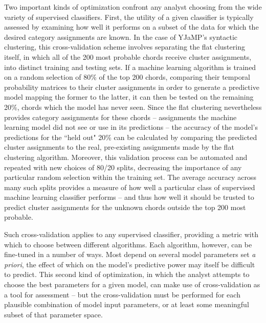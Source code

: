 Two important kinds of optimization confront any analyst choosing from the wide variety of supervised classifiers.  First, the utility of a given classifier is typically assessed by examining how well it performs on a subset of the data for which the desired category assignments are known.  In the case of YJaMP's syntactic clustering, this cross-validation scheme involves separating the flat clustering itself, in which all of the 200 most probable chords receive cluster assignments, into distinct training and testing sets.  If a machine learning algorithm is trained on a random selection of 80\% of the top 200 chords, comparing their temporal probability matrices to their cluster assignments in order to generate a predictive model mapping the former to the latter, it can then be tested on the remaining 20\%, chords which the model has never seen.  Since the flat clustering nevertheless provides category assignments for these chords -- assignments the machine learning model did not see or use in its predictions -- the accuracy of the model's predictions for the ``held out" 20\% can be calculated by comparing the predicted cluster assignments to the real, pre-existing assignments made by the flat clustering algorithm.  Moreover, this validation process can be automated and repeated with new choices of 80/20 splits, decreasing the importance of any particular random selection within the training set.  The average accuracy across many such splits provides a measure of how well a particular class of supervised machine learning classifier performs -- and thus how well it should be trusted to predict cluster assignments for the unknown chords outside the top 200 most probable.


Such cross-validation applies to any supervised classifier, providing a metric with which to choose between different algorithms.  Each algorithm, however, can be fine-tuned in a number of ways.  Most depend on several model parameters set \emph{a priori}, the effect of which on the model's predictive power may itself be difficult to predict.  This second kind of optimization, in which the analyst attempts to choose the best parameters for a given model, can make use of cross-validation as a tool for assessment -- but the cross-validation must be performed for each plausible combination of model input parameters, or at least some meaningful subset of that parameter space.

